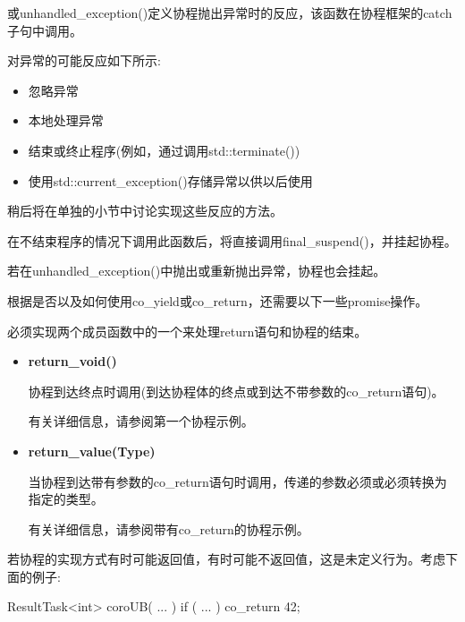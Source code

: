 
或unhandled\_exception()定义协程抛出异常时的反应，该函数在协程框架的catch子句中调用。

对异常的可能反应如下所示:

\begin{itemize}
\item
忽略异常

\item
本地处理异常

\item
结束或终止程序(例如，通过调用std::terminate())

\item
使用std::current\_exception()存储异常以供以后使用
\end{itemize}

稍后将在单独的小节中讨论实现这些反应的方法。

在不结束程序的情况下调用此函数后，将直接调用final\_suspend()，并挂起协程。

若在unhandled\_exception()中抛出或重新抛出异常，协程也会挂起。


根据是否以及如何使用co\_yield或co\_return，还需要以下一些promise操作。


必须实现两个成员函数中的一个来处理return语句和协程的结束。

\begin{itemize}
\item
\textbf{return\_void()}

协程到达终点时调用(到达协程体的终点或到达不带参数的co\_return语句)。

有关详细信息，请参阅第一个协程示例。

\item
\textbf{return\_value(Type)}

当协程到达带有参数的co\_return语句时调用，传递的参数必须或必须转换为指定的类型。

有关详细信息，请参阅带有co\_return的协程示例。
\end{itemize}

若协程的实现方式有时可能返回值，有时可能不返回值，这是未定义行为。考虑下面的例子:

\begin{cpp}
ResultTask<int> coroUB( ... )
{
	if ( ... ) {
		co_return 42;
	}
}
\end{cpp}

